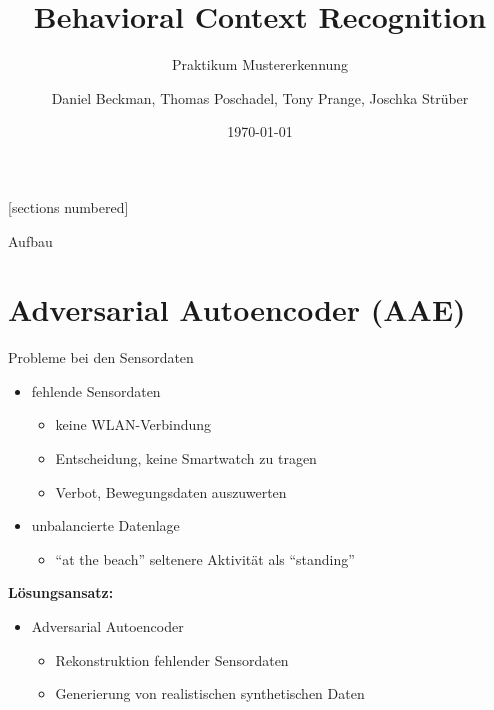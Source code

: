 \documentclass[10pt,%
	wide,%
	xcolor={x11names},%
	hyperref={colorlinks},%
	pantone312,%
	handout,%
	]{beamer}
\author{Daniel Beckman, Thomas Poschadel, Tony Prange, Joschka Strüber}
\title{Behavioral Context Recognition}
\subtitle{Praktikum Mustererkennung}
\date{\today}
\begin{document}
[sections numbered]

\begin{frame}[plain]
  \maketitle
\end{frame}

\begin{frame}[t]{Aufbau}
\end{frame}

\section{Adversarial Autoencoder (AAE)}

\begin{frame}[t]{Probleme bei den Sensordaten}
	\begin{itemize}
		\item fehlende Sensordaten
		\begin{itemize}
			\item keine WLAN-Verbindung
			\item Entscheidung, keine Smartwatch zu tragen
			\item Verbot, Bewegungsdaten auszuwerten
		\end{itemize}
		\item unbalancierte Datenlage
		\begin{itemize}
			\item \enquote{at the beach} seltenere Aktivität als \enquote{standing}
		\end{itemize}
	\end{itemize}

\textbf{Lösungsansatz:}
\begin{itemize}
	\item Adversarial Autoencoder \cite{sol18}
	\begin{itemize}
		\item Rekonstruktion fehlender Sensordaten
		\item Generierung von realistischen synthetischen Daten
	\end{itemize}
\end{itemize}
\end{frame}
\end{document}
